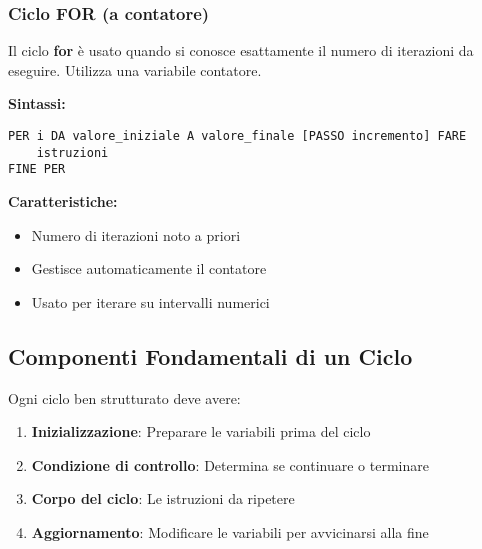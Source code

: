 \documentclass[a4paper,16pt]{article}
\begin{document}
\subsubsection{Ciclo FOR (a contatore)}

Il ciclo \textbf{for} è usato quando si conosce esattamente il numero di iterazioni da eseguire. Utilizza una variabile contatore.

\textbf{Sintassi:}
\begin{lstlisting}
PER i DA valore_iniziale A valore_finale [PASSO incremento] FARE
    istruzioni
FINE PER
\end{lstlisting}

\textbf{Caratteristiche:}
\begin{itemize}[leftmargin=*]
    \item Numero di iterazioni noto a priori
    \item Gestisce automaticamente il contatore
    \item Usato per iterare su intervalli numerici
\end{itemize}

\begin{center}
\end{center}

\newpage
\subsection{Componenti Fondamentali di un Ciclo}

Ogni ciclo ben strutturato deve avere:

\begin{enumerate}[leftmargin=*]
    \item \textbf{Inizializzazione}: Preparare le variabili prima del ciclo
    \item \textbf{Condizione di controllo}: Determina se continuare o terminare
    \item \textbf{Corpo del ciclo}: Le istruzioni da ripetere
    \item \textbf{Aggiornamento}: Modificare le variabili per avvicinarsi alla fine
\end{enumerate}
\end{document}
